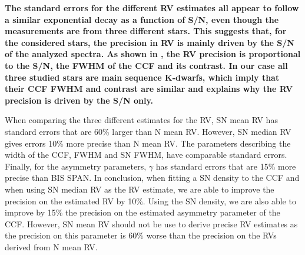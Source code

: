 \documentclass{aa}
\begin{document}
{\bf The standard errors for the different RV estimates all appear to follow a similar exponential decay as a function of S/N, even though the measurements are from three different stars. This suggests that, for the considered stars, the precision in RV is mainly driven by the S/N of the analyzed spectra. As shown in \citet{Bouchy:2005aa}, the RV precision is proportional to the S/N, the FWHM of the CCF and its contrast. In our case all three studied stars are main sequence K-dwarfs, which imply that their CCF FWHM and contrast are similar and explains why the RV precision is driven by the S/N only.}

When comparing the three different estimates for the RV, SN mean RV has standard errors that are 60\% larger than N mean RV. However, SN median RV gives errors 10\% more precise than N mean RV. 
The parameters describing the width of the CCF, FWHM and SN FWHM, have comparable standard errors. 
Finally, for the asymmetry parameters, $\gamma$ has standard errors that are 15\% more precise than BIS SPAN. 
In conclusion, when fitting a SN density to the CCF and when using SN median RV as the RV estimate, we are able to improve the precision on the estimated RV by 10\%. Using the SN density, we are also able to improve by 15\% the precision on the estimated asymmetry parameter of the CCF.  However, SN mean RV should not be use to derive precise RV estimates
as the precision on this parameter is 60\% worse than the precision on the RVs derived from N mean RV.
%
\end{document}
